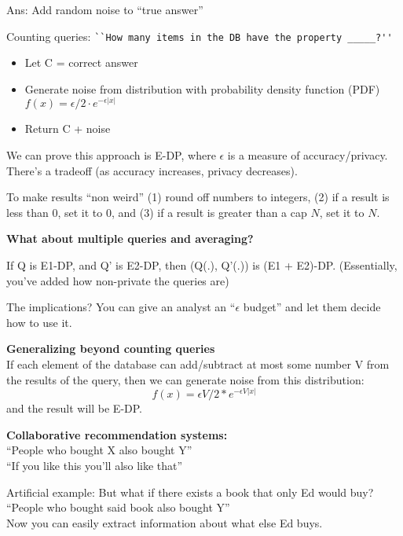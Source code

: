 Ans: Add random noise to ``true answer''

\begin{example}
Counting queries: \verb|``How many items in the DB have the property _____?''|\\

	\begin{itemize}
		\item Let C = correct answer
		\item Generate noise from distribution with probability density function (PDF) $f(x) = \epsilon/2 \cdot e^{-\epsilon|x|}$
		\item Return C + noise
	\end{itemize}
We can prove this approach is E-DP, where $\epsilon$ is a measure of accuracy/privacy. There's a tradeoff (as accuracy increases, privacy decreases).
\end{example}

To make results ``non weird'' (1) round off numbers to integers, (2) if a result is less than 0, set it to 0, and (3) if a result is greater than a cap $N$, set it to $N$.

\textbf{What about multiple queries and averaging?}
\begin{theorem}
If Q is E1-DP, and Q' is E2-DP, then (Q(.), Q'(.)) is (E1 + E2)-DP. (Essentially, you've added how non-private the queries are)
\end{theorem}

The implications? You can give an analyst an ``$\epsilon$ budget'' and let them decide how to use it.

\textbf{Generalizing beyond counting queries}\\
If each element of the database can add/subtract at most some number V from the results of the query, then we can generate noise from this distribution:
	$$f(x) = \epsilon V/2 * e^{-\epsilon V|x|}$$
and the result will be E-DP.


\textbf{Collaborative recommendation systems:}\\
	\hspace*{1cm} ``People who bought X also bought Y''\\
	\hspace*{1cm} ``If you like this you'll also like that''

\begin{example}
Artificial example: But what if there exists a book that only Ed would buy? \\
	\hspace*{1cm} ``People who bought said book also bought Y''\\
Now you can easily extract information about what else Ed buys.
\end{example}

